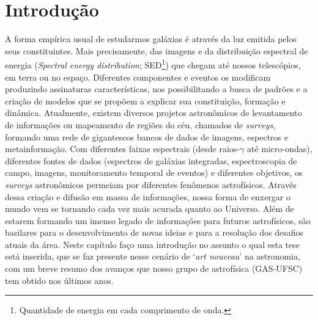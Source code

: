 





\chapter{Introdução}
\label{sec:intro}

A forma empírica usual de estudarmos galáxias é através da luz emitida pelos seus constituintes. Mais precisamente, das imagens e da distribuição espectral de energia ({\em Spectral energy distribution}; SED\footnote{Quantidade de energia em cada comprimento de onda.}) que chegam até nossos telescópios, em terra ou no espaço. Diferentes componentes e eventos os modificam produzindo assinaturas características, nos possibilitando a busca de padrões e a criação de modelos que se propõem a explicar sua constituição, formação e dinâmica. Atualmente, existem diversos projetos astronômicos de levantamento de informações ou mapeamento de regiões do céu, chamados de {\em surveys}, formando uma rede de gigantescos bancos de dados de imagens, espectros e metainformação. Com diferentes faixas espectrais (desde raios-$\gamma$ até micro-ondas), diferentes fontes de dados (espectros de galáxias integradas, espectroscopia de campo, imagens, monitoramento temporal de eventos) e diferentes objetivos, os {\em surveys} astronômicos permeiam por diferentes fenômenos astrofísicos. Através dessa criação e difusão em massa de informações, nossa forma de enxergar o mundo vem se tornando cada vez mais acurada quanto ao Universo. Além de estarem formando um imenso legado de informações para futuros astrofísicos, são basilares para o desenvolvimento de novas ideias e para a resolução dos desafios atuais da área. Neste capítulo faço uma introdução no assunto o qual esta tese está inserida, que se faz presente nesse cenário de `{\em art nouveau}' na astronomia, com um breve resumo dos avanços que nosso grupo de astrofísica (GAS-UFSC) tem obtido nos últimos anos.


